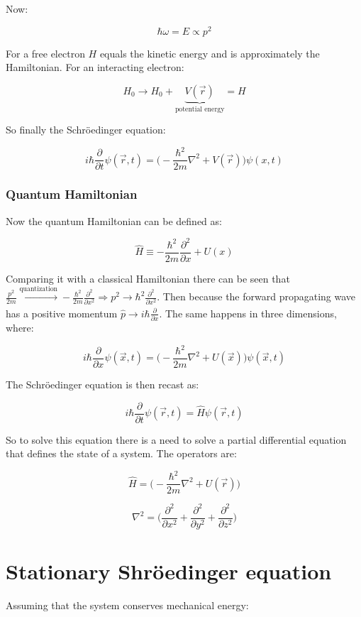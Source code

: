   Now:

  $$\hbar\omega = E \propto p^2$$

  For a free electron $H$ equals the kinetic energy and is approximately the Hamiltonian.
  For an interacting electron:

  $$H_0 \rightarrow H_0 + \underbrace{V(\vec{r})}_{\text{potential energy}} = H$$

  So finally the Schr\"oedinger equation:

  $$i\hbar \frac{\partial {}}{\partial {t}}\psi(\vec{r},t) = \biggl(-\frac{\hbar^2}{2m}\nabla^2+V(\vec{r})\biggr)\psi(x,t)$$

    \subsubsection{Quantum Hamiltonian}
    Now the quantum Hamiltonian can be defined as:

    $$\hat{H} \equiv -\frac{\hbar^2}{2m}\frac{\partial^2}{\partial x}+U(x)$$

    Comparing it with a classical Hamiltonian there can be seen that $\frac{p^2}{2m}\xrightarrow[]{\text{quantization}} - \frac{\hbar^2}{2m}\frac{\partial^2}{\partial x^2}\Rightarrow p^2\rightarrow \hbar^2\frac{\partial^2}{\partial x^2}$.
    Then because the forward propagating  wave has a positive momentum $\hat{p}\rightarrow i\hbar\frac{\partial}{\partial x}$.
    The same happens in three dimensions, where:

    $$i\hbar\frac{\partial }{\partial x}\psi(\vec{x}, t) = \biggl(-\frac{\hbar^2}{2m}\nabla^2+U(\vec{x})\biggr)\psi(\vec{x},t)$$

    The Schr\"oedinger equation is then recast as:

    $$i\hbar \frac{\partial {}}{\partial {t}}\psi(\vec{r},t) = \hat{H} \psi(\vec{r},t)$$

    So to solve this equation there is a need to solve a partial differential equation that defines the state of a system.
    The operators are:

    $$\hat{H} = \biggl(-\frac{\hbar^2}{2m}\nabla^2+U(\vec{r})\biggr)$$

    $$\nabla^2 = \biggl(\frac{\partial^2}{\partial x^2} +\frac{\partial^2}{\partial y^2} + \frac{\partial^2}{\partial z^2}\biggr)$$

\section{Stationary Shr\"oedinger equation}
Assuming that the system conserves mechanical energy:

